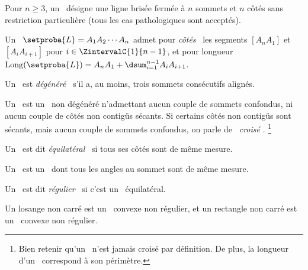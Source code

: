 \begin{defi}
	Pour $n \geq 3$, un \og \emph{\ncycle} \fg\ désigne une ligne brisée fermée à $n$ sommets et $n$ côtés sans restriction particulière (tous les cas pathologiques sont acceptés).
\end{defi}

	
\begin{defi}
	Un \ncycle\ $\setproba{L} = A_1 A_2 \cdots A_n$ admet pour \og \emph{côtés} \fg\ les segments
	$[A_n A_1]$ et	
	$[A_i A_{i+1}]$ pour $i \in \ZintervalC{1}{n-1}$,
	et pour longueur $\perim{\setproba{L}} = A_n A_1 + \dsum_{i=1}^{n-1} A_i A_{i+1}$.
\end{defi}


\begin{defi}
	Un \ncycle\ est \og \emph{dégénéré} \fg\ s'il a, au moins, trois sommets consécutifs alignés.
\end{defi}


\begin{defi}
	Un \og \emph{\ngone} \fg\ est un \ncycle\ non dégénéré n'admettant aucun couple de sommets confondus, ni aucun couple de côtés non contigüs sécants.
	Si certains côtés non contigüs sont sécants, mais aucun couple de sommets confondus, on parle de \og \emph{\ngone\ croisé} \fg.%
	\footnote{
		Bien retenir qu'un \ngone\ n'est jamais croisé par définition.
		De plus, la longueur d'un \ngone\ correspond à son périmètre.
	}
\end{defi}


\begin{defi}
	Un \ngone\ est dit \og \emph{équilatéral} \fg\ si tous ses côtés sont de même mesure.
\end{defi}


\begin{defi}
	Un \og \emph{\niso} \fg\ est un \ngone\ dont tous les angles au sommet sont de même mesure.
\end{defi}


\begin{defi}
	Un \ngone\ est dit \og \emph{régulier} \fg\ si c'est un \niso\ équilatéral.
\end{defi}


\begin{remark}
	Un losange non carré est un \nequi\ convexe non régulier, et un rectangle non carré est un \niso\ convexe non régulier.
\end{remark}
